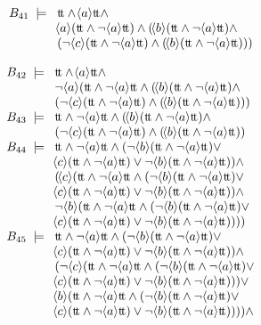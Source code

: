 \begin{example}
\[\begin{array}{l@{\;\;}c@{\;\;\;}l}
B_{41} &\models & \dtt \wedge \can{a}\dtt \wedge\\
&&\can{a}(\dtt\wedge\neg\can{a}\dtt)\wedge(\can{b}(\dtt\wedge\neg\can{a}\dtt)\wedge\\
&&(\neg\can{c}(\dtt\wedge\neg\can{a}\dtt)\wedge(\can{b}(\dtt\wedge\neg\can{a}\dtt)))\\
\end{array}
\]

\[
\begin{array}{l@{\;\;}c@{\;\;\;}l}
B_{42} &\models & \dtt \wedge \can{a}\dtt \wedge\\
&&\neg\can{a}(\dtt\wedge\neg\can{a}\dtt\wedge(\can{b}(\dtt\wedge\neg\can{a}\dtt)\wedge\\
&&(\neg\can{c}(\dtt\wedge\neg\can{a}\dtt)\wedge(\can{b}(\dtt\wedge\neg\can{a}\dtt)))\\
B_{43} &\models & \dtt \wedge \neg\can{a}\dtt \wedge(\can{b}(\dtt\wedge\neg\can{a}\dtt)\wedge\\
&&(\neg\can{c}(\dtt\wedge\neg\can{a}\dtt)\wedge(\can{b}(\dtt\wedge\neg\can{a}\dtt))\\
B_{44} &\models & \dtt \wedge \neg\can{a}\dtt \wedge(\neg\can{b}(\dtt\wedge\neg\can{a}\dtt)\vee\\
&&\can{c}(\dtt\wedge\neg\can{a}\dtt)\vee\neg\can{b}(\dtt\wedge\neg\can{a}\dtt))\wedge\\
&&(\can{c}(\dtt\wedge\neg\can{a}\dtt\wedge(\neg\can{b}(\dtt\wedge\neg\can{a}\dtt)\vee\\
&&\can{c}(\dtt\wedge\neg\can{a}\dtt)\vee\neg\can{b}(\dtt\wedge\neg\can{a}\dtt))\wedge\\
&&\neg\can{b}(\dtt\wedge\neg\can{a}\dtt\wedge(\neg\can{b}(\dtt\wedge\neg\can{a}\dtt)\vee\\
&&\can{c}(\dtt\wedge\neg\can{a}\dtt)\vee\neg\can{b}(\dtt\wedge\neg\can{a}\dtt))))\\
B_{45} &\models & \dtt \wedge \neg\can{a}\dtt \wedge(\neg\can{b}(\dtt\wedge\neg\can{a}\dtt)\vee\\
&&\can{c}(\dtt\wedge\neg\can{a}\dtt)\vee\neg\can{b}(\dtt\wedge\neg\can{a}\dtt))\wedge\\
&&(\neg\can{c}(\dtt\wedge\neg\can{a}\dtt\wedge(\neg\can{b}(\dtt\wedge\neg\can{a}\dtt)\vee\\
&&\can{c}(\dtt\wedge\neg\can{a}\dtt)\vee\neg\can{b}(\dtt\wedge\neg\can{a}\dtt)))\vee\\
&&\can{b}(\dtt\wedge\neg\can{a}\dtt\wedge(\neg\can{b}(\dtt\wedge\neg\can{a}\dtt)\vee\\
&&\can{c}(\dtt\wedge\neg\can{a}\dtt)\vee\neg\can{b}(\dtt\wedge\neg\can{a}\dtt))))\wedge\\

\end{array}\]
\end{example}

